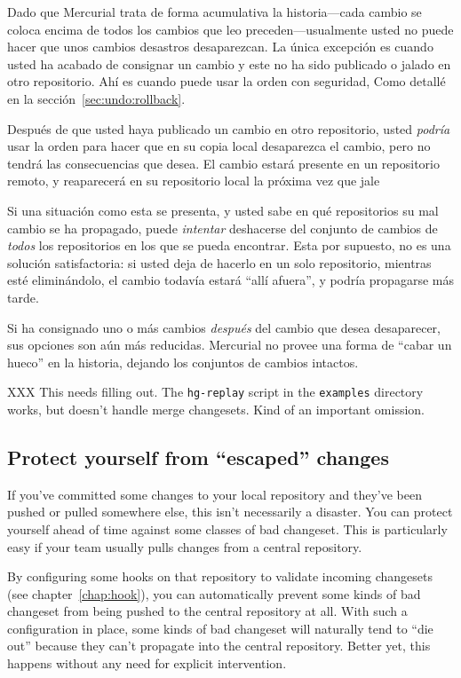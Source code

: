 Dado que Mercurial trata de forma acumulativa la historia---cada
cambio se coloca encima de todos los cambios que leo
preceden---usualmente usted no puede hacer que unos cambios desastros
desaparezcan. La única excepción es cuando usted ha acabado de
consignar un cambio y este no ha sido publicado o jalado en otro
repositorio. Ahí es cuando puede usar la orden  con
seguridad, Como detallé en la sección~\ref{sec:undo:rollback}.

Después de que usted haya publicado un cambio en otro repositorio, usted
\emph{podría} usar la orden  para hacer que en su copia
local desaparezca el cambio, pero no tendrá las consecuencias que
desea. El cambio estará presente en un repositorio remoto, y
reaparecerá en su repositorio local la próxima vez que jale

Si una situación como esta se presenta, y usted sabe en qué
repositorios su mal cambio se ha propagado, puede \emph{intentar}
deshacerse del conjunto de cambios de \emph{todos} los repositorios en
los que se pueda encontrar.  Esta por supuesto, no es una solución
satisfactoria: si usted deja de hacerlo en un solo repositorio,
mientras esté eliminándolo, el cambio todavía estará ``allí afuera'',
y podría propagarse más tarde.

Si ha consignado uno o más cambios \emph{después} del cambio que desea
desaparecer, sus opciones son aún más reducidas. Mercurial no provee
una forma de ``cabar un hueco'' en la historia, dejando los conjuntos
de cambios intactos.


XXX This needs filling out.  The \texttt{hg-replay} script in the
\texttt{examples} directory works, but doesn't handle merge
changesets.  Kind of an important omission.

\subsection{Protect yourself from ``escaped'' changes}

If you've committed some changes to your local repository and they've
been pushed or pulled somewhere else, this isn't necessarily a
disaster.  You can protect yourself ahead of time against some classes
of bad changeset.  This is particularly easy if your team usually
pulls changes from a central repository.

By configuring some hooks on that repository to validate incoming
changesets (see chapter~\ref{chap:hook}), you can automatically
prevent some kinds of bad changeset from being pushed to the central
repository at all.  With such a configuration in place, some kinds of
bad changeset will naturally tend to ``die out'' because they can't
propagate into the central repository.  Better yet, this happens
without any need for explicit intervention.

